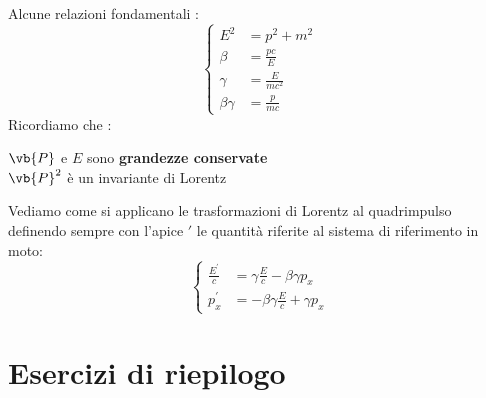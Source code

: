 \documentclass[a4paper, 12pt, twoside]{report}
\begin{document}
\begin{tcolorbox}[colback=red!5!white,colframe=red!50!black,title=ATTENZIONE !]
Alcune relazioni fondamentali : 
\begin{equation*}
        \left\{\begin{aligned}
        E^2 &= \textit{p}^2 + m^2\\
        \beta &=\frac{\textit{p}c}{E}\\ 
        \gamma &= \frac{E}{mc^2} \\
        \beta\gamma &= \frac{p}{mc}
\end{aligned}
\right.
\end{equation*}
Ricordiamo che : 
\begin{center} $\vb{P}$ e $E$ sono \textbf{grandezze conservate} \\ $\vb{P}^2$ è un invariante di Lorentz\end{center}
\end{tcolorbox}
Vediamo come si applicano le trasformazioni di Lorentz al quadrimpulso definendo sempre con l'apice $\prime$ le quantità 
riferite al sistema di riferimento in moto: 
\begin{equation*}
        \left\{\begin{aligned} 
                \frac{E^{\prime}}{c} &= \gamma\frac{E}{c} - \beta\gamma\textit{p}_{x} \\
                \textit{p}^{\prime}_{x} &= -\beta\gamma\frac{E}{c} + \gamma\textit{p}_{x}
        \end{aligned}
\right.
\end{equation*}
\section{Esercizi di riepilogo}
\end{document}
